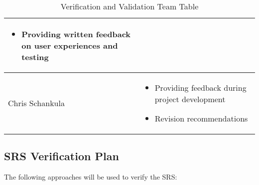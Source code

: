\documentclass[12pt, titlepage]{article}
\begin{document}
\begin{table}[h!]
\begin{tabular}{ | m{5cm} | m{8cm} | }
\begin{itemize}
      \item Providing written feedback on user experiences and testing
    \end{itemize}\\
    \hline
    Chris Schankula & \vspace{2mm}\begin{itemize}
      \item Providing feedback during project development
      \item Revision recommendations
    \end{itemize}\\
    \bottomrule
  \end{tabular}
  \caption{Verification and Validation Team Table}
\end{table}

\newpage
\subsection{SRS Verification Plan}

The following approaches will be used to verify the SRS:
\end{document}
